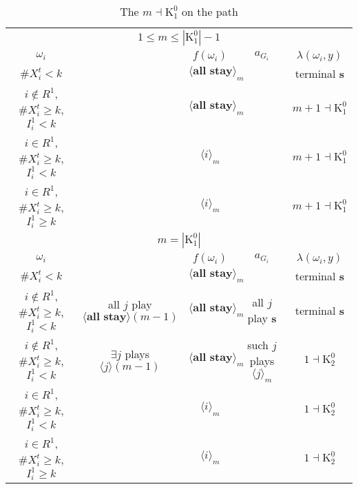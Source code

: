 \documentclass[12pt,letter]{article}
\newcommand{\Kappa}{\mathrm{K}}
\theoremstyle{definition}
\theoremstyle{remark}
\theoremstyle{claim}
\begin{document}
\begin{landscape}
\begin{table}[!htbp]
\caption{The $m\dashv\Kappa^0_{1}$ on the path}
\begin{center}
\begin{tabular}{c c | c | c | c }
\multicolumn{5}{c}{$1\leq m \leq |\Kappa^0_1|-1$}\\
$\omega_i$ 	 & 	   &	$f(\omega_i)$  &	$a_{G_i}$ & $\lambda(\omega_i,y)$ \\
\hline
\hline

$\# X^t_i<k$  	& 	 &$\langle \textbf{all stay} \rangle_m$ &	& terminal \textbf{s}\\
$i\notin R^1$, $\# X^t_i\geq k$, $I^1_i< k$  	&  &$\langle \textbf{all stay} \rangle_m$ & 	& $m+1\dashv\Kappa^0_{1}$\\
$i\in R^1$, $\# X^t_i\geq k$, $I^1_i< k$  	& 	 &$\langle i \rangle_m$	&  & $m+1\dashv \Kappa^0_{1}$\\
$i\in R^1$, $\# X^t_i\geq k$, $I^1_i\geq k$  	& 	 &$\langle i \rangle_m$	&  & $m+1\dashv \Kappa^0_{1}$\\
\hline
\multicolumn{5}{c}{$m=|\Kappa^0_1|$}\\
$\omega_i$ 	 & 	   &	$f(\omega_i)$  &	$a_{G_i}$ & $\lambda(\omega_i,y)$ \\
\hline
\hline
$\# X^t_i<k$  	& 	& $\langle \textbf{all stay} \rangle_m$	&     & terminal \textbf{s}\\
$i\notin R^1$, $\# X^t_i\geq k$, $I^1_i< k$   	& all $j$ play $\langle \textbf{all stay} \rangle(m-1)$ & $\langle \textbf{all stay} \rangle_m$	 & all $j$ play \textbf{s} & terminal \textbf{s}\\
$i\notin R^1$, $\# X^t_i\geq k$, $I^1_i< k$   	& $\exists j$ plays $\langle j \rangle(m-1)$ & $\langle \textbf{all stay} \rangle_m$	& such $j$ plays $\langle j \rangle_m$  & $1\dashv \Kappa^0_2$\\
$i\in R^1$, $\# X^t_i\geq k$, $I^1_i< k$   	& 	& $\langle i \rangle_m$	&& $1\dashv \Kappa^0_2$ \\
$i\in R^1$, $\# X^t_i\geq k$, $I^1_i\geq k$  	& 	& $\langle i \rangle_m$ &	& $1\dashv \Kappa^0_2$ \\
\hline
\end{tabular}
\end{center}
\end{table}



\end{landscape}
\end{document}
